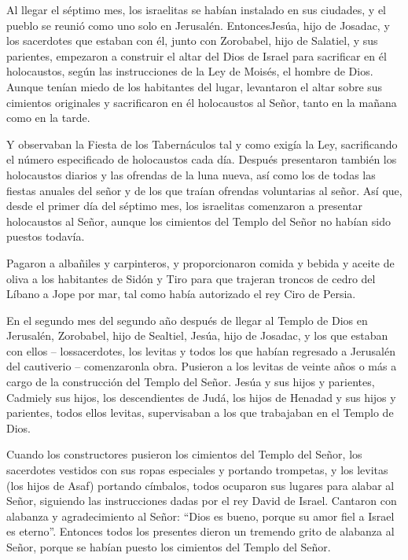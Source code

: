  Al llegar el séptimo mes, los israelitas se habían
instalado en sus ciudades, y el pueblo se reunió como uno solo en
Jerusalén.  EntoncesJesúa, hijo de Josadac, y los sacerdotes
que estaban con él, junto con Zorobabel, hijo de Salatiel, y sus
parientes, empezaron a construir el altar del Dios de Israel para
sacrificar en él holocaustos, según las instrucciones de la Ley de
Moisés, el hombre de Dios.  Aunque tenían miedo de los
habitantes del lugar, levantaron el altar sobre sus cimientos originales
y sacrificaron en él holocaustos al Señor, tanto en la mañana como en la
tarde.

 Y observaban la Fiesta de los Tabernáculos tal y como
exigía la Ley, sacrificando el número especificado de holocaustos cada
día.  Después presentaron también los holocaustos diarios y
las ofrendas de la luna nueva, así como los de todas las fiestas anuales
del señor y de los que traían ofrendas voluntarias al señor.
 Así que, desde el primer día del séptimo mes, los
israelitas comenzaron a presentar holocaustos al Señor, aunque los
cimientos del Templo del Señor no habían sido puestos todavía.

 Pagaron a albañiles y carpinteros, y proporcionaron comida
y bebida y aceite de oliva a los habitantes de Sidón y Tiro para que
trajeran troncos de cedro del Líbano a Jope por mar, tal como había
autorizado el rey Ciro de Persia.

 En el segundo mes del segundo año después de llegar al
Templo de Dios en Jerusalén, Zorobabel, hijo de Sealtiel, Jesúa, hijo de
Josadac, y los que estaban con ellos -- lossacerdotes, los levitas y
todos los que habían regresado a Jerusalén del cautiverio --
comenzaronla obra. Pusieron a los levitas de veinte años o más a cargo
de la construcción del Templo del Señor.  Jesúa y sus hijos
y parientes, Cadmiely sus hijos, los descendientes de Judá, los hijos de
Henadad y sus hijos y parientes, todos ellos levitas, supervisaban a los
que trabajaban en el Templo de Dios.

 Cuando los constructores pusieron los cimientos del Templo
del Señor, los sacerdotes vestidos con sus ropas especiales y portando
trompetas, y los levitas (los hijos de Asaf) portando címbalos, todos
ocuparon sus lugares para alabar al Señor, siguiendo las instrucciones
dadas por el rey David de Israel.  Cantaron con alabanza y
agradecimiento al Señor: ``Dios es bueno, porque su amor fiel a Israel
es eterno''. Entonces todos los presentes dieron un tremendo grito de
alabanza al Señor, porque se habían puesto los cimientos del Templo del
Señor.

